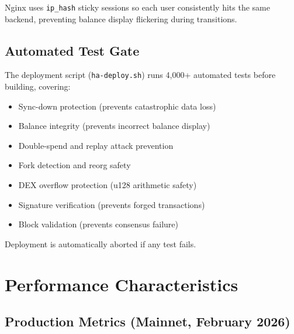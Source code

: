 \documentclass[11pt,a4paper]{article}
\begin{document}
Nginx uses \texttt{ip\_hash} sticky sessions so each user consistently hits the same backend, preventing balance display flickering during transitions.

\subsection{Automated Test Gate}

The deployment script (\texttt{ha-deploy.sh}) runs 4,000+ automated tests before building, covering:

\begin{itemize}
    \item Sync-down protection (prevents catastrophic data loss)
    \item Balance integrity (prevents incorrect balance display)
    \item Double-spend and replay attack prevention
    \item Fork detection and reorg safety
    \item DEX overflow protection (u128 arithmetic safety)
    \item Signature verification (prevents forged transactions)
    \item Block validation (prevents consensus failure)
\end{itemize}

Deployment is automatically aborted if any test fails.

\section{Performance Characteristics}

\subsection{Production Metrics (Mainnet, February 2026)}
\end{document}
